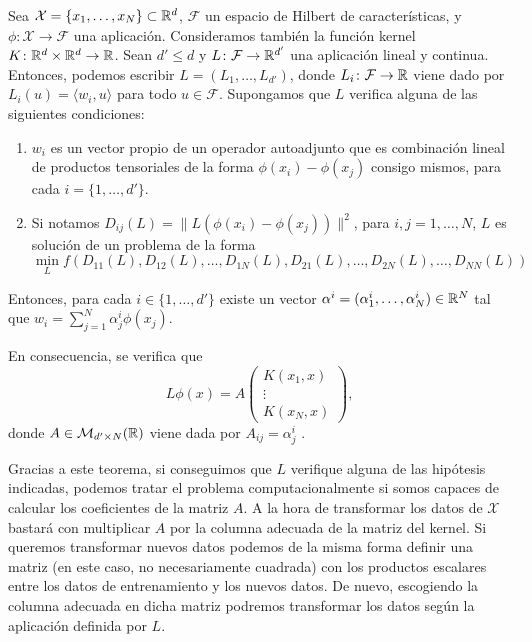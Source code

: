 \documentclass{book}
\begin{document}
\begin{thm} \label{thm:representer}
	Sea $\mathcal{X} = \{x_1,\dots,x_N\} \subset \mathbb{R}^d$, $\mathcal{F}$ un espacio de Hilbert de características, y $\phi \colon \mathcal{X} \to \mathcal{F}$ una aplicación. Consideramos también la función kernel $K \colon \mathbb{R}^d \times \mathbb{R}^d \to \mathbb{R}$. Sean $d' \le d$ y $L\colon \mathcal{F} \to \mathbb{R}^{d'}$ una aplicación lineal y continua. Entonces, podemos escribir $L = (L_1, \dots, L_{d'})$, donde $L_i \colon \mathcal{F} \to \mathbb{R}$ viene dado por $L_i(u) = \langle w_i, u \rangle$ para todo $u \in \mathcal{F}$. Supongamos que $L$ verifica alguna de las siguientes condiciones:

	\begin{enumerate}
		\item  $w_i$ es un vector propio de un operador autoadjunto que es combinación lineal de productos tensoriales de la forma $\phi(x_i)-\phi(x_j)$ consigo mismos, para cada $i = \{1,\dots,d'\}$. \label{item:representer:1}
		\item Si notamos $D_{ij}(L) = \|L(\phi(x_i) - \phi(x_j))\|^2$, para $i,j = 1,\dots,N$, $L$ es solución de un problema de la forma
		\begin{equation}
			\min_{L} f(D_{11}(L),D_{12}(L),\dots,D_{1N}(L),D_{21}(L),\dots,D_{2N}(L),\dots,D_{NN}(L))
		\end{equation} \label{item:representer:2}
	\end{enumerate}

	Entonces, para cada $i \in \{1,\dots,d'\}$ existe un vector $\alpha^i = (\alpha_1^i,\dots,\alpha_{N}^i) \in \mathbb{R}^{N}$ tal que $w_i = \sum_{j=1}^N \alpha_j^i \phi(x_j)$.

	En consecuencia, se verifica que 
	\[L\phi(x) = A \begin{pmatrix} K(x_1,x) \\ \vdots \\ K(x_N,x) \end{pmatrix},\]
	donde $A \in \mathcal{M}_{d'\times N}(\mathbb{R})$ viene dada por $A_{ij} = \alpha_j^i$  .
\end{thm}

Gracias a este teorema, si conseguimos que $L$ verifique alguna de las hipótesis indicadas, podemos tratar el problema computacionalmente si somos capaces de calcular los coeficientes de la matriz $A$. A la hora de transformar los datos de $\mathcal{X}$ bastará con multiplicar $A$ por la columna adecuada de la matriz del kernel. Si queremos transformar nuevos datos podemos de la misma forma definir una matriz (en este caso, no necesariamente cuadrada) con los productos escalares entre los datos de entrenamiento y los nuevos datos. De nuevo, escogiendo la columna adecuada en dicha matriz podremos transformar los datos según la aplicación definida por $L$.
\end{document}
